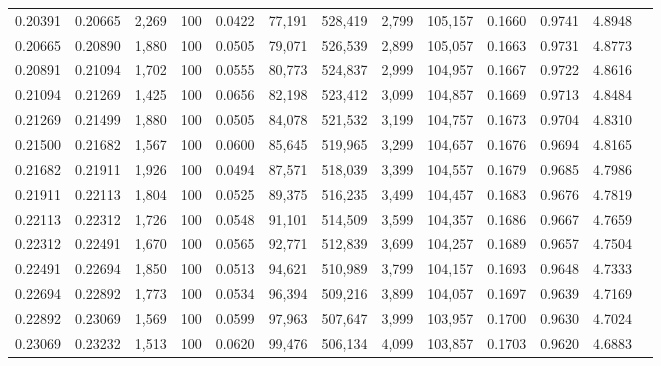 \begin{tabular}{rrrrrrrrrrrrr}
0.20391 & 0.20665 & 2,269 & 100 &                                     0.0422 &  77,191 & 528,419 &   2,799 & 105,157 & 0.1660 & 0.9741 & 4.8948 \\
0.20665 & 0.20890 & 1,880 & 100 &                                     0.0505 &  79,071 & 526,539 &   2,899 & 105,057 & 0.1663 & 0.9731 & 4.8773 \\
0.20891 & 0.21094 & 1,702 & 100 &                                     0.0555 &  80,773 & 524,837 &   2,999 & 104,957 & 0.1667 & 0.9722 & 4.8616 \\
0.21094 & 0.21269 & 1,425 & 100 &                                     0.0656 &  82,198 & 523,412 &   3,099 & 104,857 & 0.1669 & 0.9713 & 4.8484 \\
0.21269 & 0.21499 & 1,880 & 100 &                                     0.0505 &  84,078 & 521,532 &   3,199 & 104,757 & 0.1673 & 0.9704 & 4.8310 \\
0.21500 & 0.21682 & 1,567 & 100 &                                     0.0600 &  85,645 & 519,965 &   3,299 & 104,657 & 0.1676 & 0.9694 & 4.8165 \\
0.21682 & 0.21911 & 1,926 & 100 &                                     0.0494 &  87,571 & 518,039 &   3,399 & 104,557 & 0.1679 & 0.9685 & 4.7986 \\
0.21911 & 0.22113 & 1,804 & 100 &                                     0.0525 &  89,375 & 516,235 &   3,499 & 104,457 & 0.1683 & 0.9676 & 4.7819 \\
0.22113 & 0.22312 & 1,726 & 100 &                                     0.0548 &  91,101 & 514,509 &   3,599 & 104,357 & 0.1686 & 0.9667 & 4.7659 \\
0.22312 & 0.22491 & 1,670 & 100 &                                     0.0565 &  92,771 & 512,839 &   3,699 & 104,257 & 0.1689 & 0.9657 & 4.7504 \\
0.22491 & 0.22694 & 1,850 & 100 &                                     0.0513 &  94,621 & 510,989 &   3,799 & 104,157 & 0.1693 & 0.9648 & 4.7333 \\
0.22694 & 0.22892 & 1,773 & 100 &                                     0.0534 &  96,394 & 509,216 &   3,899 & 104,057 & 0.1697 & 0.9639 & 4.7169 \\
0.22892 & 0.23069 & 1,569 & 100 &                                     0.0599 &  97,963 & 507,647 &   3,999 & 103,957 & 0.1700 & 0.9630 & 4.7024 \\
0.23069 & 0.23232 & 1,513 & 100 &                                     0.0620 &  99,476 & 506,134 &   4,099 & 103,857 & 0.1703 & 0.9620 & 4.6883 \\

\end{tabular}

